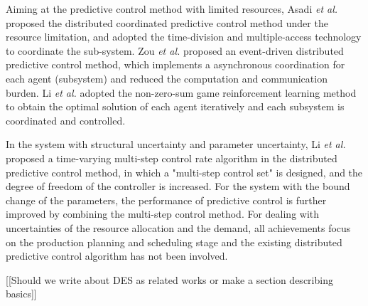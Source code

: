 \documentclass[runningheads]{llncs}
\begin{document}
Aiming at the predictive control method with limited resources, Asadi \emph{et al.} \cite{asadi} proposed the distributed coordinated predictive control method under the resource limitation, and adopted the time-division and multiple-access technology to coordinate the sub-system. Zou \emph{et al.} \cite{zouyy} proposed an event-driven distributed predictive control method, which implements a asynchronous coordination for each agent (subsystem) and reduced the computation and communication burden. Li \emph{et al.} \cite{lijn} adopted the non-zero-sum game reinforcement learning method to obtain the optimal solution of each agent iteratively and each subsystem is coordinated and controlled.

In the system with structural uncertainty and parameter uncertainty, Li \emph{et al.} \cite{lidewei} proposed a time-varying multi-step control rate algorithm in the distributed predictive control method, in which a "multi-step control set" is designed, and the degree of freedom of the controller is increased. For the system with the bound change of the parameters, the performance of predictive control is further improved by combining the multi-step control method. For dealing with uncertainties of the resource allocation and the demand, all achievements focus on the production planning and scheduling stage and the existing distributed predictive control algorithm has not been involved.

[[Should we write about DES as related works or make a section describing basics]]

\end{document}
